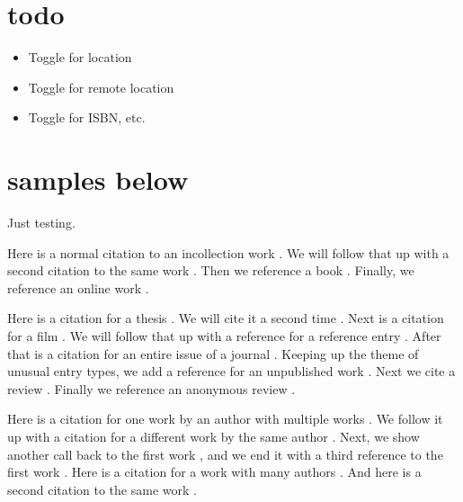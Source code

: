 \documentclass{article}
\begin{document}
	
\section{todo} %
\label{sec:todo}
\begin{itemize}
	\item Toggle for location
	\item Toggle for remote location
	\item Toggle for ISBN, etc.
\end{itemize}
	
\section{samples below} %
\label{sec:samples_below}
Just testing.

Here is a normal citation to an incollection work \autocite[7]{haggis99aa}. We will follow that up with a second citation to the same work \autocite[8]{haggis99aa}. Then we reference a book \autocite[194]{public08aa}. Finally, we reference an online work \autocite{Grammar-Girl2008}.

Here is a citation for a thesis \autocite[22]{webb84aa}. We will cite it a second time \autocite[23]{webb84aa}. Next is a citation for a film \autocite{jhabvala85aa}. We will follow that up with a reference for a reference entry \autocite{reference-noon89aa}. After that is a citation for an entire issue of a journal \autocite{appiah92aa}. Keeping up the theme of unusual entry types, we add a reference for an unpublished work \autocite{salviatiXXaa}. Next we cite a review \autocite[224]{slater01aa}. Finally we reference an anonymous review \autocite[785]{danish1972aa}.

Here is a citation for one work by an author with multiple works \autocite[12]{askme06aa}. We follow it up with a citation for a different work by the same author \autocite[34]{askme92aa}. Next, we show another call back to the first work \autocite[45]{askme06aa}, and we end it with a third reference to the first work \autocite[56]{askme06aa}. Here is a citation for a work with many authors \autocite[34]{Babich:2011dg}. And here is a second citation to the same work \autocite[32]{Babich:2011dg}.
\end{document}

